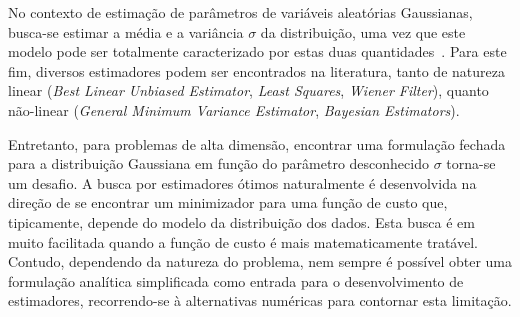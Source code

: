 \documentclass[a4paper,titlepage]{article}
\begin{document}
\begin{center}
  \vspace{1em}
  \vspace{1em}
\end{center}

No contexto de estimação de parâmetros de variáveis aleatórias Gaussianas,
busca-se estimar a média e a variância $\sigma$ da distribuição, uma vez que
este modelo pode ser totalmente caracterizado por estas duas
quantidades~\cite{kay}. Para este fim, diversos estimadores podem ser
encontrados na literatura, tanto de natureza linear (\textit{Best Linear
Unbiased Estimator}, \textit{Least Squares}, \textit{Wiener Filter}), quanto
não-linear (\textit{General Minimum Variance Estimator}, \textit{Bayesian
Estimators})\cite{kay,haykin}.

Entretanto, para problemas de alta dimensão, encontrar uma formulação fechada
para a distribuição Gaussiana em função do parâmetro desconhecido $\sigma$
torna-se um desafio. A busca por estimadores ótimos naturalmente é desenvolvida
na direção de se encontrar um minimizador para uma função de custo que,
tipicamente, depende do modelo da distribuição dos dados\cite{kay}. Esta busca
é em muito facilitada quando a função de custo é mais matematicamente tratável.
Contudo, dependendo da natureza do problema, nem sempre é possível obter uma
formulação analítica simplificada como entrada para o desenvolvimento de
estimadores, recorrendo-se à alternativas numéricas para contornar esta
limitação.
\end{document}
